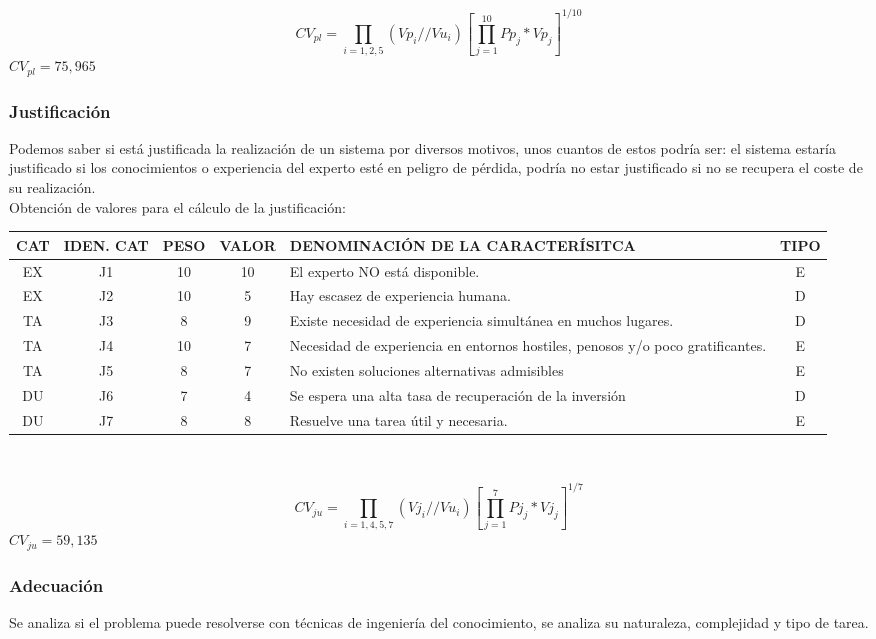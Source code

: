 \documentclass[letterpaper,12pt]{article}
\begin{document}
\begin{center}
\[
CV_{pl} = \prod_{i=1,2,5}(Vp_{i}//Vu_{i})[\prod_{j=1}^{10}Pp_{j}*Vp_{j}]^{1/10}
\]
$CV_{pl} = 75,965$
\end{center}

\newpage
\subsubsection{Justificación}
Podemos saber si está justificada la realización de un sistema por diversos
motivos, unos cuantos de estos podría ser: el sistema estaría justificado si los conocimientos o experiencia del experto esté en peligro de pérdida, podría no estar justificado si no se recupera el coste de su realización. \\

Obtención de valores para el cálculo de la justificación:


\begin{tabular}{|c|c|c|c|p{7.3 cm}|c|}
\hline 
CAT & IDEN. CAT & PESO & VALOR & DENOMINACIÓN DE LA CARACTERÍSITCA & TIPO \\ 
\hline 
EX & J1 & 10 & 10 & El experto NO está disponible. & E \\ 
\hline 
EX & J2 & 10 & 5 & Hay escasez de experiencia humana. & D \\ 
\hline 
TA & J3 & 8 & 9 & Existe necesidad de experiencia simultánea en muchos lugares. & D \\ 
\hline 
TA & J4 & 10 & 7 & Necesidad de experiencia en entornos hostiles, penosos y/o poco gratificantes. & E \\ 
\hline 
TA & J5 & 8 & 7 & No existen soluciones alternativas admisibles & E \\ 
\hline 
DU & J6 & 7 & 4 & Se espera una alta tasa de recuperación de la inversión & D \\ 
\hline 
DU & J7 & 8 & 8 & Resuelve una tarea útil y necesaria. & E \\ 
\hline 
\end{tabular} \\

\begin{center}
\[
CV_{ju} = \prod_{i=1,4,5,7}(Vj_{i}//Vu_{i})[\prod_{j=1}^{7}Pj_{j}*Vj_{j}]^{1/7}
\]
$CV_{ju} = 59,135$
\end{center}

\newpage
\subsubsection{Adecuación}
Se analiza si el problema puede resolverse con técnicas de ingeniería del conocimiento, se analiza su naturaleza, complejidad y tipo de tarea.\\
\end{document}
